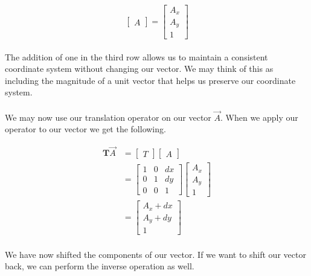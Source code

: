 \documentclass[12pt, letterpaper]{report}
\begin{document}
	\begin{equation}
	\begin{bmatrix}
	A
	\end{bmatrix}
	=
	\begin{bmatrix}
	A_x\\
	A_y\\
	1
	\end{bmatrix}
	\end{equation}
	
	\paragraph{} The addition of one in the third row allows us to maintain a consistent coordinate system without changing our vector. We may think of this as including the magnitude of a unit vector that helps us preserve our coordinate system. 

	\paragraph{} We may now use our translation operator on our vector $\overrightarrow{A}$. When we apply our operator to our vector we get the following.
	
	\begin{align*}
	\mathbf 
	T\overrightarrow{A} 
	&= 
	\begin{bmatrix}
	T
	\end{bmatrix}
	\begin{bmatrix}
	A
	\end{bmatrix}\\
	&=
	\begin{bmatrix}
	1 & 0 & dx\\
	0 & 1 & dy\\
	0 & 0 & 1
	\end{bmatrix}
	\begin{bmatrix}
	A_x\\
	A_y\\
	1
	\end{bmatrix}\\
	&=
	\begin{bmatrix}
	A_x+dx\\
	A_y+dy\\
	1
	\end{bmatrix}
	\end{align*}

	\paragraph{} We have now shifted the components of our vector. If we want to shift our vector back, we can perform the inverse operation as well.
	
\end{document}
